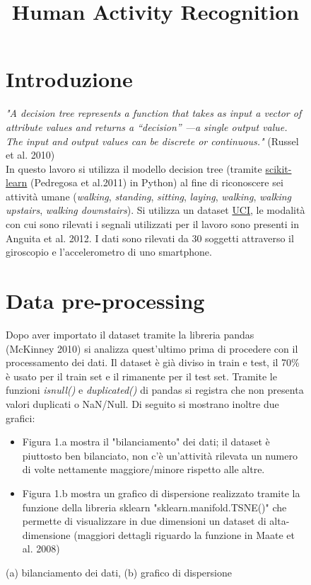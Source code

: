 \documentclass[]{article}
\title{Human Activity Recognition}
\date{}
\begin{document}
\begin{figure}
\maketitle
\section{Introduzione}
\textit{"A decision tree represents a function that takes as input a vector of attribute values and returns a “decision” —a single output value. The input and output values can be discrete or continuous."}  (Russel et al. 2010) \\
In questo lavoro si utilizza il modello decision tree (tramite \href{https://scikit-learn.org/stable/}{scikit-learn} (Pedregosa et al.2011) in Python) al fine di riconoscere sei attività umane (\textit{walking}, \textit{standing}, \textit{sitting}, \textit{laying}, \textit{walking}, \textit{walking upstairs}, \textit{walking downstairs}). Si utilizza un dataset \href{http://archive.ics.uci.edu/ml/datasets/Human+Activity+Recognition+Using+Smartphones}{UCI}, le modalità con cui sono rilevati i segnali utilizzati per il lavoro sono presenti in Anguita et al. 2012. I dati sono rilevati da 30 soggetti attraverso il giroscopio e l'accelerometro di uno smartphone. 


\section{Data pre-processing}
Dopo aver importato il dataset tramite la libreria pandas (McKinney 2010) si analizza quest'ultimo prima di procedere con il processamento dei dati. Il dataset è già diviso in train e test, il 70\% è usato per il train set e il rimanente per il test set.
Tramite le funzioni \textit{isnull()} e \textit{duplicated()} di pandas si registra che non presenta valori duplicati o NaN/Null.
Di seguito si mostrano inoltre due grafici:
\begin{itemize}
\item Figura 1.a mostra il "bilanciamento" dei dati; il dataset è piuttosto ben bilanciato, non c'è un'attività rilevata un numero di volte nettamente maggiore/minore rispetto alle altre.
\item Figura 1.b mostra un grafico di dispersione realizzato tramite la funzione della libreria sklearn "sklearn.manifold.TSNE()" che permette di visualizzare in due dimensioni un dataset di alta-dimensione (maggiori dettagli riguardo la funzione in Maate et al. 2008)
\end{itemize}
\hspace*{\fill}
\caption{(a) bilanciamento dei dati, (b) grafico di dispersione} 
\medskip




\end{figure}
\end{document}
